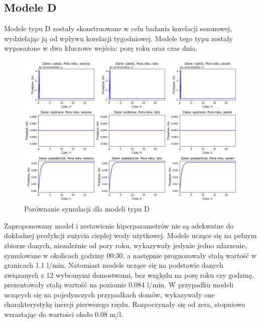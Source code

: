 \documentclass[a4paper,twoside,12pt]{book}
\begin{document}
\newpage
\subsection*{Modele D}
Modele typu D zostały skonstruowane w celu badania korelacji sezonowej, wydzielając ją od wpływu korelacji tygodniowej. Modele tego typu zostały wyposażone w dwa kluczowe wejścia: porę roku oraz czas dnia.
\begin{figure}[!h]
  \centering
  \includegraphics[width=1\textwidth]{img/Model_D.png}
  \caption{Porównanie symulacji dla modeli typu D}
  \label{fig:etykieta-rysunku}
\end{figure}

Zaproponowany model i zestawienie hiperparametrów nie są adekwatne do dokładnej predykcji zużycia ciepłej wody użytkowej. Modele uczące się na pełnym zbiorze danych, niezależnie od pory roku, wykazywały jedynie jedno zdarzenie, symulowane w okolicach godziny 00:30, a następnie prognozowały stałą wartość w granicach 1.1 l/min. Natomiast modele uczące się na podstawie danych związanych z 12 wybranymi domostwami, bez względu na porę roku czy godzinę, prezentowały stałą wartość na poziomie 0.084 l/min. W przypadku modeli uczących się na pojedynczych przypadkach domów, wykazywały one charakterystykę inercji pierwszego rzędu. Rozpoczynały się od zera, stopniowo wzrastając do wartości około 0.08 m/l.\\
\end{document}
